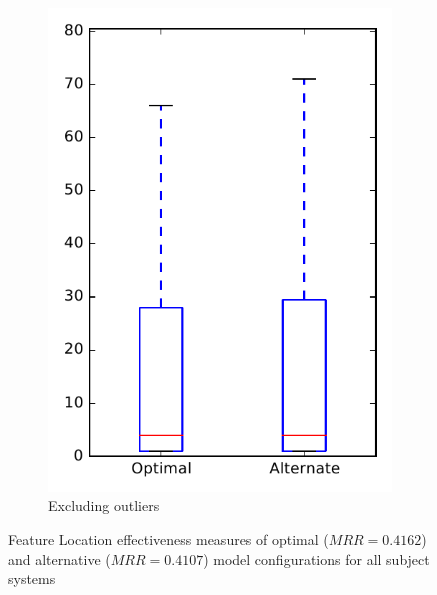 \begin{figure}
\begin{subfigure}{.4\textwidth}
        \includegraphics[height=0.4\textheight]{figures/combo/flt_rq1_all_no_outlier}
        \caption{Excluding outliers}\label{fig:combo:flt:rq1:all_no_outlier}
    \end{subfigure}
\caption[Feature Location effectiveness measures of optimal and alternative model configurations for all subject systems]%
{Feature Location effectiveness measures of optimal ($MRR=0.4162$) and alternative ($MRR=0.4107$) model configurations for all subject systems}
\label{fig:combo:flt:rq1:all}
\end{figure}
